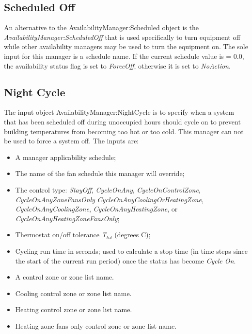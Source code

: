 \subsection{Scheduled Off}\label{scheduled-off}

An alternative to the AvailabilityManager:Scheduled object is the \emph{AvailabilityManager:ScheduledOff} that is used specifically to turn equipment off while other availability managers may be used to turn the equipment on. The sole input for this manager is a schedule name. If the current schedule value is = 0.0, the availability status flag is set to \emph{ForceOff}; otherwise it is set to \emph{NoAction}.

\subsection{Night Cycle}\label{night-cycle}

The input object AvailabilityManager:NightCycle is to specify when a system that has been scheduled off during unoccupied hours should cycle on to prevent building temperatures from becoming too hot or too cold. This manager can not be used to force a system off. The inputs are:

\begin{itemize}
\item  A manager applicability schedule;

\item  The name of the fan schedule this manager will override;

\item  The control type: \emph{StayOff}, \emph{CycleOnAny}, \emph{CycleOnControlZone}, \emph{CycleOnAnyZoneFansOnly} \emph{CycleOnAnyCoolingOrHeatingZone}, \emph{CycleOnAnyCoolingZone}, \emph{CycleOnAnyHeatingZone}, or \emph{CycleOnAnyHeatingZoneFansOnly};

\item  Thermostat on/off tolerance \emph{T\(_{tol}\)} (degrees C);

\item  Cycling run time in seconds; used to calculate a stop time (in time steps since the start of the current run period) once the status has become \emph{Cycle On}.

\item  A control zone or zone list name.

\item  Cooling control zone or zone list name.

\item  Heating control zone or zone list name.

\item  Heating zone fans only control zone or zone list name.

\end{itemize}

